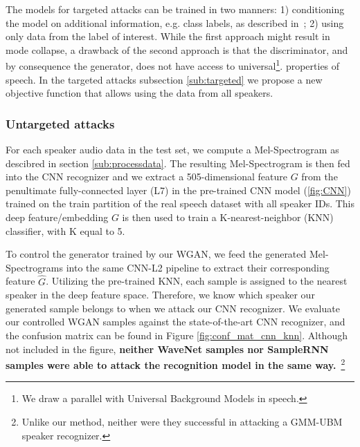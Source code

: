 The models for targeted attacks can be trained in two manners: 1) 
conditioning the model on additional information, e.g. class labels, as
described in~\cite{mirza2014conditional}; 2) using only data from the label 
of interest. While the first approach might result in mode collapse, a drawback
of the second approach is that the discriminator, and by consequence the
generator, does not have access to universal\footnote{We draw a parallel with 
Universal Background Models in speech.}. properties of speech. In the targeted 
attacks subsection \ref{sub:targeted} we propose a new objective function that allows 
using the data from all speakers.  

\subsubsection{Untargeted attacks}
\label{sub:untargeted}
For each speaker audio data in the test set, we compute a Mel-Spectrogram as
descibred in section \ref{sub:processdata}. The resulting Mel-Spectrogram is
then fed into the CNN recognizer and we extract a 505-dimensional feature $G$ from
the penultimate fully-connected layer (L7) in the pre-trained CNN model
(\ref{fig:CNN}) trained on the train partition of the real speech dataset with all 
speaker IDs.  This deep feature/embedding $G$ is then used to train a 
K-nearest-neighbor (KNN) classifier, with K equal to 5.

To control the generator trained by our WGAN, we feed the generated
Mel-Spectrograms into the same CNN-L2 pipeline to extract their corresponding
feature $\widehat G$. Utilizing the pre-trained KNN, each sample is assigned to
the nearest speaker in the deep feature space. Therefore, we know which speaker
our generated sample belongs to when we attack our CNN recognizer. We evaluate our
controlled WGAN samples against the state-of-the-art CNN recognizer, and the
confusion matrix can be found in Figure \ref{fig:conf_mat_cnn_knn}. Although not
included in the figure, \textbf{neither WaveNet samples nor SampleRNN samples
were able to attack the recognition model in the same way.}~\footnote{Unlike our
method, neither were they successful in attacking a GMM-UBM speaker recognizer.}


